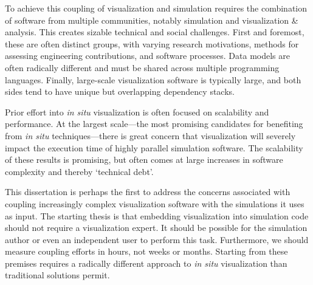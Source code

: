 To achieve this coupling of visualization and simulation requires the
combination of software from multiple communities, notably simulation
and visualization \& analysis.  This creates sizable technical and
social challenges.  First and foremost, these are often distinct
groups, with varying research motivations, methods for assessing
engineering contributions, and software processes.  Data models
are often radically different and must be shared across multiple
programming languages.  Finally, large-scale visualization software is
typically large, and both sides tend to have unique but overlapping
dependency stacks.


Prior effort into \textit{in situ} visualization is often focused on
scalability and performance.  At the largest scale---the most promising
candidates for benefiting from \textit{in situ} techniques---there is
great concern that visualization will severely impact the execution
time of highly parallel simulation software.  The scalability of these
results is promising, but often comes at large increases in software
complexity and thereby `technical debt'.


This dissertation is perhaps the first to address the concerns
associated with coupling increasingly complex visualization software
with the simulations it uses as input.  The starting thesis is that
embedding visualization into simulation code should not require a
visualization expert.  It should be possible for the simulation author
or even an independent user to perform this task.  Furthermore,
we should measure coupling efforts in hours, not weeks or months.
Starting from
these premises requires a radically different approach to \textit{in
situ} visualization than traditional solutions permit.



